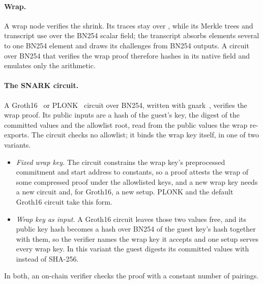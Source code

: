 \paragraph{Wrap.} A wrap node verifies the \Poseidon{} shrink. Its traces stay over \KB{}, while its Merkle trees and transcript use \Poseidon{} over the BN254 scalar field; the transcript absorbs \KB{} elements several to one BN254 element and draws its \KB{} challenges from BN254 outputs. A circuit over BN254 that verifies the wrap proof therefore hashes in its native field and emulates only the \KB{} arithmetic.

\paragraph{The SNARK circuit.} A Groth16~\citep{groth16} or PLONK~\citep{plonk} circuit over BN254, written with gnark~\citep{gnark}, verifies the wrap proof. Its public inputs are a hash of the guest's key, the digest of the committed values and the allowlist root, read from the public values the wrap re-exports. The circuit checks no allowlist; it binds the wrap key itself, in one of two variants.
\begin{itemize}
  \item \emph{Fixed wrap key.} The circuit constrains the wrap key's preprocessed commitment and start address to constants, so a proof attests the wrap of some compressed proof under the allowlisted keys, and a new wrap key needs a new circuit and, for Groth16, a new setup. PLONK and the default Groth16 circuit take this form.
  \item \emph{Wrap key as input.} A Groth16 circuit leaves those two values free, and its public key hash becomes a \Poseidon{} hash over BN254 of the guest key's hash together with them, so the verifier names the wrap key it accepts and one setup serves every wrap key. In this variant the guest digests its committed values with \Blake{} instead of SHA-256.
\end{itemize}
In both, an on-chain verifier checks the proof with a constant number of pairings.
